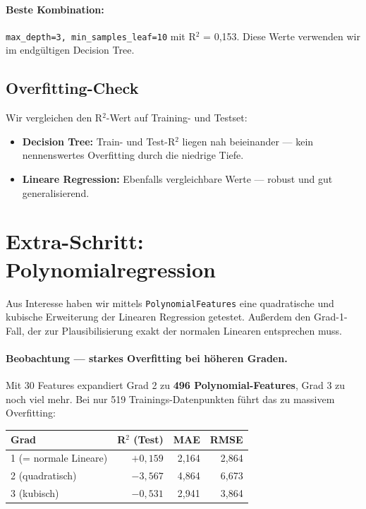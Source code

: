\documentclass[11pt,a4paper]{article}
\begin{document}
\paragraph{Beste Kombination:} \texttt{max\_depth=3, min\_samples\_leaf=10} mit R$^{2}$ = 0{,}153. Diese Werte verwenden wir im endgültigen Decision Tree.

\subsection{Overfitting-Check}
Wir vergleichen den R$^{2}$-Wert auf Training- und Testset:
\begin{itemize}
    \item \textbf{Decision Tree:} Train- und Test-R$^{2}$ liegen nah beieinander --- kein nennenswertes Overfitting durch die niedrige Tiefe.
    \item \textbf{Lineare Regression:} Ebenfalls vergleichbare Werte --- robust und gut generalisierend.
\end{itemize}

\section{Extra-Schritt: Polynomialregression}

Aus Interesse haben wir mittels \texttt{PolynomialFeatures} eine quadratische und kubische Erweiterung der Linearen Regression getestet. Außerdem den Grad-1-Fall, der zur Plausibilisierung exakt der normalen Linearen entsprechen muss.

\paragraph{Beobachtung --- starkes Overfitting bei höheren Graden.}
Mit 30 Features expandiert Grad 2 zu \textbf{496 Polynomial-Features}, Grad 3 zu noch viel mehr. Bei nur 519 Trainings-Datenpunkten führt das zu massivem Overfitting:

\begin{center}
\begin{tabular}{lrrr}
\toprule
\textbf{Grad} & \textbf{R$^{2}$ (Test)} & \textbf{MAE} & \textbf{RMSE} \\
\midrule
1 (= normale Lineare) & $+0{,}159$ & 2{,}164 & 2{,}864 \\
2 (quadratisch) & $-3{,}567$ & 4{,}864 & 6{,}673 \\
3 (kubisch) & $-0{,}531$ & 2{,}941 & 3{,}864 \\
\bottomrule
\end{tabular}
\end{center}
\end{document}
